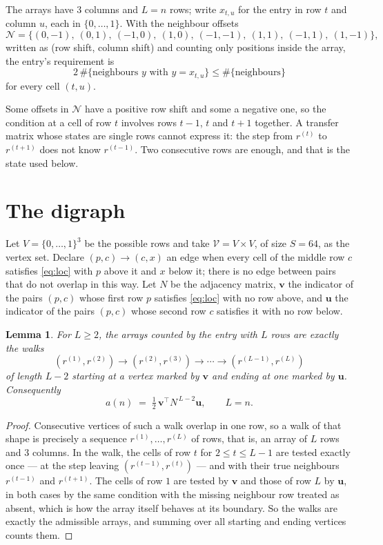 \documentclass[11pt,a4paper]{article}
\theoremstyle{plain}
\newtheorem{lemma}[theorem]{Lemma}
\theoremstyle{definition}
\begin{document}
The arrays have $3$ columns and $L=n$ rows; write $x_{t,u}$ for the entry in
row $t$ and column $u$, each in $\{0,\dots,1\}$. With the neighbour offsets
\[
\mathcal N=\{(0,-1),\ (0,1),\ (-1,0),\ (1,0),\ (-1,-1),\ (1,1),\ (-1,1),\ (1,-1)\},
\]
written as (row shift, column shift) and counting only positions inside the array, the
entry's requirement is
\begin{equation}\label{eq:loc}
2\,\#\{\text{neighbours }y\text{ with }y=x_{t,u}\}\le\#\{\text{neighbours}\}
\end{equation}
for every cell $(t,u)$.

Some offsets in $\mathcal N$ have a positive row shift and some a negative one, so the
condition at a cell of row $t$ involves rows $t-1$, $t$ and $t+1$ together. A transfer
matrix whose states are single rows cannot express it: the step from $r^{(t)}$ to
$r^{(t+1)}$ does not know $r^{(t-1)}$. Two consecutive rows are enough, and that is
the state used below.

\section{The digraph}

Let $V=\{0,\dots,1\}^{3}$ be the possible rows and take
$\mathcal V=V\times V$, of size $S=64$, as the vertex set. Declare $(p,c)\to(c,x)$ an edge
when every cell of the middle row $c$ satisfies \eqref{eq:loc} with $p$ above it and $x$
below it; there is no edge between pairs that do not overlap in this way. Let $N$ be the
adjacency matrix, $\mathbf{v}$ the indicator of the pairs $(p,c)$ whose first row $p$
satisfies \eqref{eq:loc} with no row above, and $\mathbf{u}$ the indicator of
the pairs $(p,c)$ whose second row $c$ satisfies it with no row below.

\begin{lemma}\label{lem:walk}
For $L\ge2$, the arrays counted by the entry with $L$ rows are exactly the walks
\[
(r^{(1)},r^{(2)})\to(r^{(2)},r^{(3)})\to\cdots\to(r^{(L-1)},r^{(L)})
\]
of length $L-2$ starting at a vertex marked by $\mathbf{v}$ and ending at one marked by
$\mathbf{u}$. Consequently
\[
a(n)\;=\;\tfrac1{2}\,\mathbf{v}^{\!\top}N^{\,L-2}\mathbf{u},\qquad L=n .
\]
\end{lemma}

\begin{proof}
Consecutive vertices of such a walk overlap in one row, so a walk of that shape is
precisely a sequence $r^{(1)},\dots,r^{(L)}$ of rows, that is, an array of $L$ rows
and $3$ columns. In the walk, the cells of row $t$ for $2\le t\le L-1$ are tested
exactly once --- at the step leaving $(r^{(t-1)},r^{(t)})$ --- and with their true
neighbours $r^{(t-1)}$ and $r^{(t+1)}$. The cells of row $1$ are tested by
$\mathbf{v}$ and those of row $L$ by $\mathbf{u}$, in both cases by the same condition
with the missing neighbour row treated as absent, which is how the array itself behaves at
its boundary. So the walks are exactly the admissible arrays, and summing over all starting
and ending vertices counts them.
\end{proof}
\end{document}
